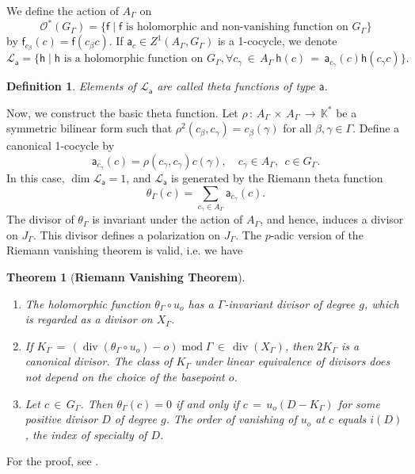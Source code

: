 \documentclass[]{amsart}
\numberwithin{equation}{section}
\newtheorem{theorem}{Theorem}[section]
\newtheorem{definition}{Definition}[section]
\newcommand{\sfa}{\mathsf{a}}
\newcommand{\sff}{\mathsf{f}}
\newcommand{\sfh}{\mathsf{h}}
\DeclareMathOperator{\divOp}{div}
\DeclareMathOperator{\modOp}{mod}
\begin{document}
We define the action of  $A_{\Gamma}$  on 
$$\mathcal{O}^{\ast}(G_{\Gamma})=\{ \sff  \mid \sff \text{ is holomorphic and non-vanishing function on } G_{\Gamma} \}$$ 
by $\sff_{c_\beta}(c)= \sff(c_\beta c)$. 
If  $\sfa_{c}{}\in Z^{1}(A_{\Gamma},G_{\Gamma})$ %
is a 1-cocycle, we denote 
$$\mathcal{L}_{\sfa} = \big\{\sfh \mid \sfh \text{ is a holomorphic function on } 
G_{\Gamma}, \forall c_\gamma \,{\in}\, A_{\Gamma}\ \sfh(c)\,{=}\,\sfa_{c_{\gamma}}(c) \sfh(c_\gamma c) \big\}.$$ 
\begin{definition} 
Elements of $\mathcal{L}_{\sfa}$ are called theta functions of type $\sfa$.
\end{definition} 
Now, we construct the basic theta function. 
Let $\rho\,{:}\,A_{\Gamma} \,{\times}\, A_{\Gamma} \,{\to}\, \mathbb{K}^{\ast}$ 
be a symmetric bilinear form such that 
$\rho^2(c_\beta,c_\gamma) = c_\beta(\gamma)$ for all $\beta,\gamma \in \Gamma$. 
Define a canonical 1-cocycle by 
$$\sfa_{c_\gamma}(c)= \rho(c_\gamma,c_\gamma) c(\gamma),\quad
c_\gamma\in A_{\Gamma},\ \ c\in G_{\Gamma}.$$ 
In this case, $\dim \mathcal{L}_{\sfa} =1$,  and $\mathcal{L}_{\sfa}$ is generated by the Riemann theta function
\begin{equation} 
\theta_{\Gamma}(c)=\sum_{c_\gamma \in A_{\Gamma}} \sfa_{c_\gamma}(c).
\end{equation}
The divisor of $\theta_{\Gamma}$ is  invariant under the action of $A_{\Gamma}$, and hence, induces a divisor on $J_{\Gamma}$. This divisor defines a polarization on $J_{\Gamma}$. The $p$-adic version of the Riemann 
vanishing theorem is valid, i.e.  we have 
\begin{theorem}[\textbf{Riemann Vanishing Theorem}]\label{RVT}\
\begin{enumerate} 
\item The holomorphic function $\theta_{\Gamma} \circ u_o$ 
has a $\Gamma$-invariant divisor of degree $g$, 
which is regarded as a divisor on $X_{\Gamma}$.
\item If $K_{\Gamma} \,{=}\, 
(\divOp (\theta_{\Gamma} \circ u_o) - o) \modOp \Gamma\,{\in}\, \divOp(X_{\Gamma})$, 
then $2 K_{\Gamma}$ is a canonical divisor. 
The class of $K_{\Gamma}$ under linear equivalence of divisors 
does not depend on the choice of the basepoint $o$.
\item Let $c\,{\in}\, G_{\Gamma}$. Then $\theta_{\Gamma}(c)=0$ 
if and only if $c\,{=}\,u_o(D -K_{\Gamma})$ for some positive divisor $D$ of degree $g$. The order of vanishing of $u_o$ at $c$ equals $i(D)$, the index of specialty of $D$. 
\end{enumerate} 
\end{theorem} 
For the proof, see  \cite{V2,GV}.
\end{document}
